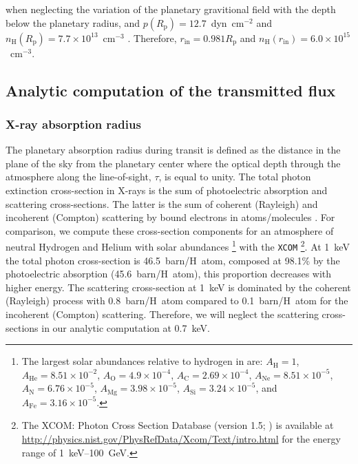 \documentclass[iop]{emulateapj}
\begin{document}
when neglecting the variation of the planetary gravitional field with the depth below the planetary radius, and 
$p(R_\mathrm{p})=12.7$~dyn~cm$^{-2}$ and $n_\mathrm{H}(R_\mathrm{p})=7.7\times10^{13}$~cm$^{-3}$ \citep{Salz2016}. Therefore, 
$r_\mathrm{in}=0.981R_\mathrm{p}$ and $n_\mathrm{H}(r_\mathrm{in})=6.0\times10^{15}$~cm$^{-3}$.




\subsection{Analytic computation of the transmitted flux}
\label{Model:Transit}

\subsubsection{X-ray absorption radius}
The planetary absorption radius during transit is defined as the distance in the plane of the sky from the planetary center where the optical 
depth through the atmosphere along the line-of-sight, $\tau$, is equal to unity. The total photon extinction cross-section in X-rays is the sum of
photoelectric absorption and scattering cross-sections. The latter is the sum of coherent (Rayleigh) and incoherent (Compton) scattering by 
bound electrons in atoms/molecules \citep{Hubbell1975}. For comparison, we compute these cross-section components for an atmosphere of 
neutral Hydrogen and Helium with solar abundances \citep{Asplund2009}\footnote{The largest solar abundances relative to hydrogen 
in \cite{Asplund2009} are: $A_\mathrm{H}=1$, $A_\mathrm{He}=8.51\times10^{-2}$, $A_\mathrm{O}=4.9\times10^{-4}$, $A_\mathrm{C}=2.69\times10^{-4}$,
$A_\mathrm{Ne}=8.51\times10^{-5}$, $A_\mathrm{N}=6.76\times10^{-5}$, $A_\mathrm{Mg}=3.98\times10^{-5}$, $A_\mathrm{Si}=3.24\times10^{-5}$, 
and $A_\mathrm{Fe}=3.16\times10^{-5}$.} with the {\tt XCOM} \citep{Berger1987}\footnote{The XCOM: Photon Cross Section Database 
(version 1.5; \citealt{Berger2010}) is available at \href{http://physics.nist.gov/PhysRefData/Xcom/Text/intro.html}{
http://physics.nist.gov\-/PhysRefData/Xcom/Text/intro.html} for the energy range of 1~keV--100~GeV.}. At 1~keV the total photon 
cross-section is 46.5~barn/H~atom, composed at 98.1\% by the photoelectric absorption (45.6~barn/H~atom), this proportion decreases 
with higher energy. The scattering cross-section at 1~keV is dominated by the coherent (Rayleigh) process with 0.8~barn/H~atom compared 
to 0.1~barn/H~atom for the incoherent (Compton) scattering. Therefore, we will neglect the scattering cross-sections in our analytic computation
at 0.7~keV.
\end{document}
